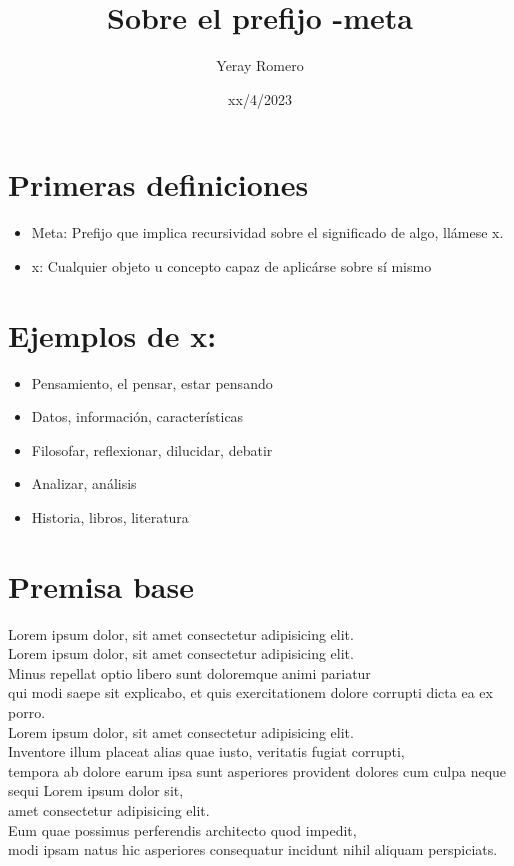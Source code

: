 \documentclass{article}
\title{Sobre el prefijo -meta}
\date{xx/4/2023}
\author{Yeray Romero}
\begin{document}
\maketitle

\section{Primeras definiciones}
\begin{itemize}
\item Meta: Prefijo que implica recursividad sobre el significado de algo, llámese x.
\item x: Cualquier objeto u concepto capaz de aplicárse sobre sí mismo
\end{itemize}
\section{Ejemplos de x:}
\begin{itemize}
\item Pensamiento, el pensar, estar pensando
\item Datos, información, características
\item Filosofar, reflexionar, dilucidar, debatir
\item Analizar, análisis
\item Historia, libros, literatura
\end{itemize}
\section{Premisa base}
Lorem ipsum dolor, sit amet consectetur adipisicing elit. \\
Lorem ipsum dolor, sit amet consectetur adipisicing elit. \\
Minus repellat optio libero sunt doloremque animi pariatur \\
qui modi saepe sit explicabo, et quis exercitationem dolore corrupti dicta ea ex porro. \\
Lorem ipsum dolor, sit amet consectetur adipisicing elit. \\
Inventore illum placeat alias quae iusto, veritatis fugiat corrupti,\\
tempora ab dolore earum ipsa sunt asperiores provident dolores cum culpa neque sequi Lorem ipsum dolor sit, \\
amet consectetur adipisicing elit. \\
Eum quae possimus perferendis architecto quod impedit, \\
modi ipsam natus hic asperiores consequatur incidunt nihil aliquam perspiciats.
\end{document}
